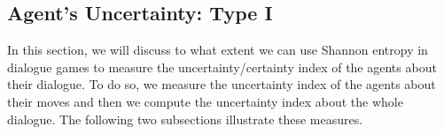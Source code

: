 %



\subsection{Agent's Uncertainty: Type I}\label{sec:type1}

In this section, we will discuss to what extent we can use Shannon entropy in dialogue games to measure the uncertainty/certainty
index of the agents about their dialogue. To do so, we measure the uncertainty index of the agents about their moves and then we
compute the uncertainty index about the whole dialogue. The following two subsections illustrate these measures.

